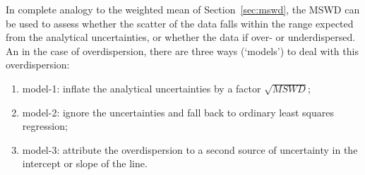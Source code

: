 \begin{refsection}
In complete analogy to the weighted mean of Section~\ref{sec:mswd},
the MSWD can be used to assess whether the scatter of the data falls
within the range expected from the analytical uncertainties, or
whether the data if over- or underdispersed. An in the case of
overdispersion, there are three ways (`models') to deal with this
overdispersion:

\begin{enumerate}
\item model-1: inflate the analytical uncertainties by a factor
  $\sqrt{MSWD}$;
\item model-2: ignore the uncertainties and fall back to ordinary
  least squares regression;
\item model-3: attribute the overdispersion to a second source of
  uncertainty in the intercept or slope of the line.
\end{enumerate}


\end{refsection}
